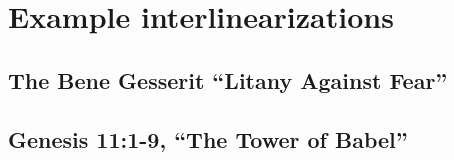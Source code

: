 \chapter{Example interlinearizations}
\label{chap:interlin}

\section{The Bene Gesserit ``Litany Against Fear''}

\section{Genesis 11:1-9, ``The Tower of Babel''}